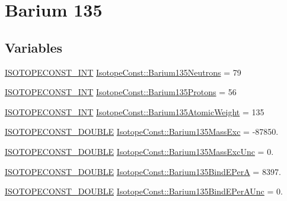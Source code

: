 \hypertarget{group___isotope_const-_barium-_ba135}{}\section{Barium 135}
\label{group___isotope_const-_barium-_ba135}
\subsection*{Variables}
\begin{DoxyCompactItemize}
\item 
\mbox{\hyperlink{group___isotope_const-_macros_ga5f18360b3e99483a35c32d789e62621c}{I\+S\+O\+T\+O\+P\+E\+C\+O\+N\+S\+T\+\_\+\+I\+NT}} \mbox{\hyperlink{group___isotope_const-_barium-_ba135_ga61e3534ba08ed137f933554ca0fba307}{Isotope\+Const\+::\+Barium135\+Neutrons}} = 79
\item 
\mbox{\hyperlink{group___isotope_const-_macros_ga5f18360b3e99483a35c32d789e62621c}{I\+S\+O\+T\+O\+P\+E\+C\+O\+N\+S\+T\+\_\+\+I\+NT}} \mbox{\hyperlink{group___isotope_const-_barium-_ba135_ga487c9bfce0d2317bba0d5cec487714af}{Isotope\+Const\+::\+Barium135\+Protons}} = 56
\item 
\mbox{\hyperlink{group___isotope_const-_macros_ga5f18360b3e99483a35c32d789e62621c}{I\+S\+O\+T\+O\+P\+E\+C\+O\+N\+S\+T\+\_\+\+I\+NT}} \mbox{\hyperlink{group___isotope_const-_barium-_ba135_ga418d494a0952d86ae7f0cd8d92811a1c}{Isotope\+Const\+::\+Barium135\+Atomic\+Weight}} = 135
\item 
\mbox{\hyperlink{group___isotope_const-_macros_ga8f45a7272ce02c0b4c65c44636ed719a}{I\+S\+O\+T\+O\+P\+E\+C\+O\+N\+S\+T\+\_\+\+D\+O\+U\+B\+LE}} \mbox{\hyperlink{group___isotope_const-_barium-_ba135_ga2efc21cc9fb03fc73be2db7c5ea0b5ed}{Isotope\+Const\+::\+Barium135\+Mass\+Exc}} = -\/87850.
\item 
\mbox{\hyperlink{group___isotope_const-_macros_ga8f45a7272ce02c0b4c65c44636ed719a}{I\+S\+O\+T\+O\+P\+E\+C\+O\+N\+S\+T\+\_\+\+D\+O\+U\+B\+LE}} \mbox{\hyperlink{group___isotope_const-_barium-_ba135_ga2cabb3d4927cf255559593b7dc84a682}{Isotope\+Const\+::\+Barium135\+Mass\+Exc\+Unc}} = 0.
\item 
\mbox{\hyperlink{group___isotope_const-_macros_ga8f45a7272ce02c0b4c65c44636ed719a}{I\+S\+O\+T\+O\+P\+E\+C\+O\+N\+S\+T\+\_\+\+D\+O\+U\+B\+LE}} \mbox{\hyperlink{group___isotope_const-_barium-_ba135_gae2eda39e5c5d8ef02a55d8bed7b80e0a}{Isotope\+Const\+::\+Barium135\+Bind\+E\+PerA}} = 8397.
\item 
\mbox{\hyperlink{group___isotope_const-_macros_ga8f45a7272ce02c0b4c65c44636ed719a}{I\+S\+O\+T\+O\+P\+E\+C\+O\+N\+S\+T\+\_\+\+D\+O\+U\+B\+LE}} \mbox{\hyperlink{group___isotope_const-_barium-_ba135_gaa7eaa3bce4df9821688e55ca39e65475}{Isotope\+Const\+::\+Barium135\+Bind\+E\+Per\+A\+Unc}} = 0.

\end{DoxyCompactItemize}
